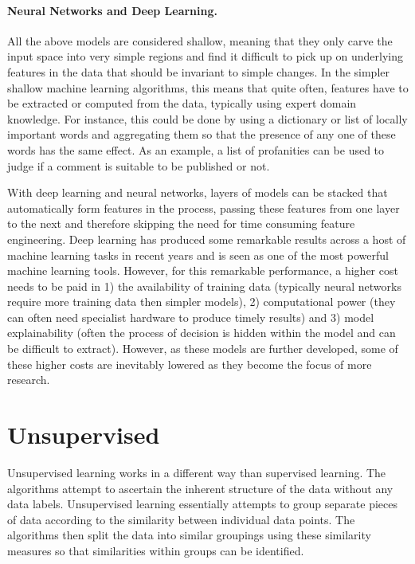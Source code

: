 \paragraph{Neural Networks and Deep Learning.} All the above models are considered shallow, meaning that they only carve the input space into very simple regions and find it difficult to pick up on underlying features in the data that should be invariant to simple changes. In the simpler shallow machine learning algorithms, this means that quite often, features have to be extracted or computed from the data, typically using expert domain knowledge. For instance, this could be done by using a dictionary or list of locally important words and aggregating them so that the presence of any one of these words has the same effect. As an example, a list of profanities can be used to judge if a comment is suitable to be published or not.

With deep learning and neural networks, layers of models can be stacked that automatically form features in the process, passing these features from one layer to the next and therefore skipping the need for time consuming feature engineering. Deep learning has produced some remarkable results across a host of machine learning tasks in recent years and is seen as one of the most powerful machine learning tools. However, for this remarkable performance, a higher cost needs to be paid in 1) the availability of training data (typically neural networks require more training data then simpler models), 2) computational power (they can often need specialist hardware to produce timely results) and 3) model explainability (often the process of decision is hidden within the model and can be difficult to extract). However, as these models are further developed, some of these higher costs are inevitably lowered as they become the focus of more research.


\section{Unsupervised} Unsupervised learning works in a different way than supervised learning. The algorithms attempt to ascertain the inherent structure of the data without any data labels. Unsupervised learning essentially attempts to group separate pieces of data according to the similarity between individual data points. The algorithms then split the data into similar groupings using these similarity measures so that similarities within groups can be identified.

